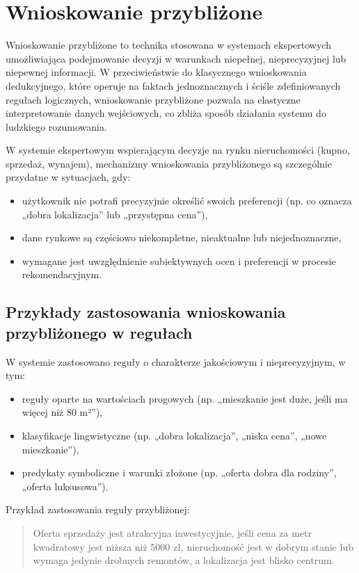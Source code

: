 \section{Wnioskowanie przybliżone}

Wnioskowanie przybliżone to technika stosowana w systemach ekspertowych umożliwiająca podejmowanie decyzji w warunkach niepełnej, nieprecyzyjnej lub niepewnej informacji. W przeciwieństwie do klasycznego wnioskowania dedukcyjnego, które operuje na faktach jednoznacznych i ściśle zdefiniowanych regułach logicznych, wnioskowanie przybliżone pozwala na elastyczne interpretowanie danych wejściowych, co zbliża sposób działania systemu do ludzkiego rozumowania.

W systemie ekspertowym wspierającym decyzje na rynku nieruchomości (kupno, sprzedaż, wynajem), mechanizmy wnioskowania przybliżonego są szczególnie przydatne w sytuacjach, gdy:
\begin{itemize}
    \item użytkownik nie potrafi precyzyjnie określić swoich preferencji (np. co oznacza „dobra lokalizacja” lub „przystępna cena”),
    \item dane rynkowe są częściowo niekompletne, nieaktualne lub niejednoznaczne,
    \item wymagane jest uwzględnienie subiektywnych ocen i preferencji w procesie rekomendacyjnym.
\end{itemize}

\subsection*{Przykłady zastosowania wnioskowania przybliżonego w regułach}

W systemie zastosowano reguły o charakterze jakościowym i nieprecyzyjnym, w tym:
\begin{itemize}
    \item reguły oparte na wartościach progowych (np. „mieszkanie jest duże, jeśli ma więcej niż 80 m²”),
    \item klasyfikacje lingwistyczne (np. „dobra lokalizacja”, „niska cena”, „nowe mieszkanie”),
    \item predykaty symboliczne i warunki złożone (np. „oferta dobra dla rodziny”, „oferta luksusowa”).
\end{itemize}

Przykład zastosowania reguły przybliżonej:

\begin{quote}
Oferta sprzedaży jest atrakcyjna inwestycyjnie, jeśli cena za metr kwadratowy jest niższa niż 5000 zł, nieruchomość jest w dobrym stanie lub wymaga jedynie drobnych remontów, a lokalizacja jest blisko centrum.
\end{quote}


